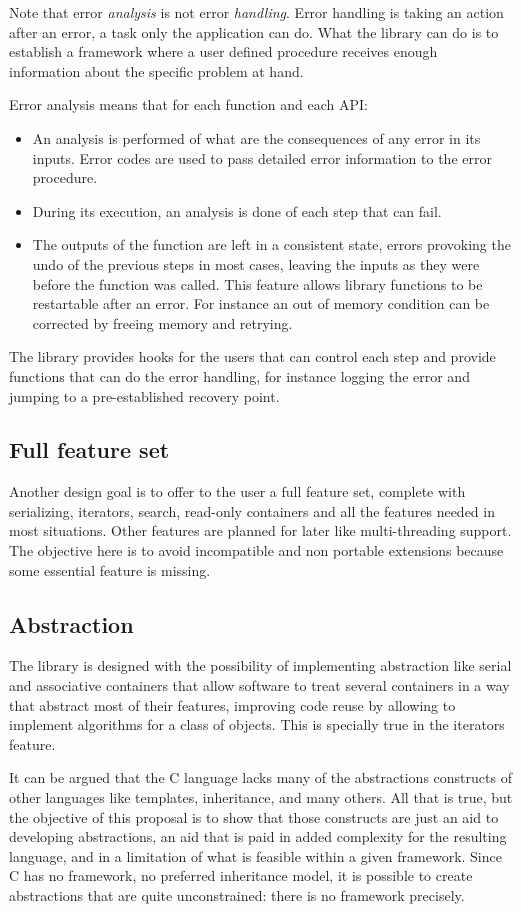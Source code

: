 Note that error \textsl{analysis} is not error \textsl{handling}. Error handling is taking an action after an error, a task only the application can do.
What the library can do is to establish a framework where a user defined procedure receives enough information about the specific problem at hand.

Error analysis means that for each function and each API:
\begin{itemize}
\item An analysis is performed of what are the consequences of any error in its inputs. Error codes are used to pass detailed error information
to the error procedure.
\item During its execution, an analysis is done of each step that can fail.
\item The outputs of the function are left in a consistent state, errors provoking the undo of the previous steps in most cases, leaving the inputs
as they were before the function was called. This feature allows library functions to be restartable after an error. For instance an out of memory
condition can be corrected by freeing memory and retrying.
\end{itemize}
The library provides hooks for the users that can control each step and provide functions that can do the error handling, for instance logging the
error and jumping to a pre-established recovery point.
\subsection{Full feature set}
Another design goal is to offer to the user a full feature set, complete with serializing, iterators, search, read-only containers and all the features 
needed in most
situations. Other features are planned for later like multi-threading support. The objective here is to avoid incompatible and non portable extensions
because some essential feature is missing.
\subsection{Abstraction}
The library is designed with the possibility of implementing abstraction like serial and associative containers that allow software to treat several 
containers in a way that abstract most of their features, improving code reuse by allowing to implement algorithms for a class of objects. This is
specially true in the iterators feature.

It can be argued that the C language lacks many of the abstractions constructs of other languages like templates, inheritance, and many others.
All that is true, but the objective of this proposal is to show that those constructs are just an aid to developing abstractions, an aid that
is paid in added complexity for the resulting language, and in a limitation of what is feasible within a given framework. Since C has no 
framework, no preferred inheritance model, it is possible to create abstractions that are quite unconstrained: there is no framework precisely.
